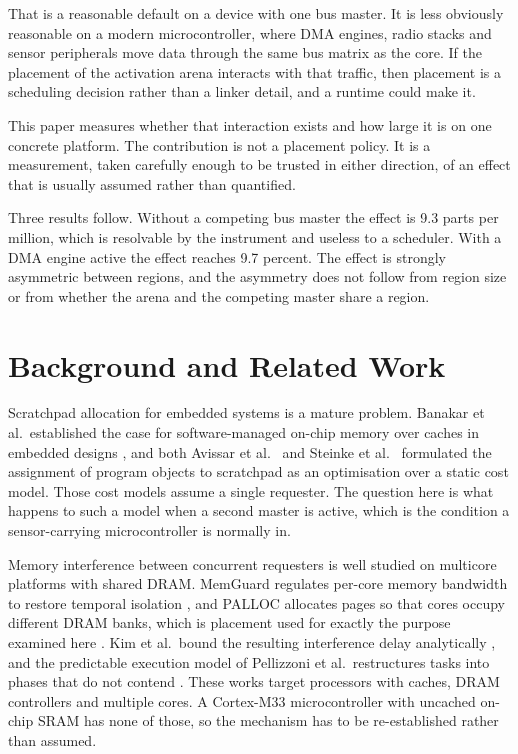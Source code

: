 \documentclass[conference]{IEEEtran}
\begin{document}
That is a reasonable default on a device with one bus master. It is less
obviously reasonable on a modern microcontroller, where DMA engines,
radio stacks and sensor peripherals move data through the same bus matrix
as the core. If the placement of the activation arena interacts with that
traffic, then placement is a scheduling decision rather than a linker
detail, and a runtime could make it.

This paper measures whether that interaction exists and how large it is
on one concrete platform. The contribution is not a placement policy. It
is a measurement, taken carefully enough to be trusted in either
direction, of an effect that is usually assumed rather than quantified.

Three results follow. Without a competing bus master the effect is 9.3
parts per million, which is resolvable by the instrument and useless to a
scheduler. With a DMA engine active the effect reaches 9.7 percent. The
effect is strongly asymmetric between regions, and the asymmetry does not
follow from region size or from whether the arena and the competing
master share a region.

\section{Background and Related Work}

Scratchpad allocation for embedded systems is a mature problem. Banakar
et al.\ established the case for software-managed on-chip memory over
caches in embedded designs \cite{banakar2002}, and both Avissar et al.\
\cite{avissar2002} and Steinke et al.\ \cite{steinke2002} formulated the
assignment of program objects to scratchpad as an optimisation over a
static cost model. Those cost models assume a single requester. The
question here is what happens to such a model when a second master is
active, which is the condition a sensor-carrying microcontroller is
normally in.

Memory interference between concurrent requesters is well studied on
multicore platforms with shared DRAM. MemGuard regulates per-core memory
bandwidth to restore temporal isolation \cite{yun2013}, and PALLOC
allocates pages so that cores occupy different DRAM banks, which is
placement used for exactly the purpose examined here \cite{yun2014}. Kim
et al.\ bound the resulting interference delay analytically
\cite{kim2014}, and the predictable execution model of Pellizzoni et
al.\ restructures tasks into phases that do not contend
\cite{pellizzoni2011}. These works target processors with caches, DRAM
controllers and multiple cores. A Cortex-M33 microcontroller with
uncached on-chip SRAM has none of those, so the mechanism has to be
re-established rather than assumed.
\end{document}
